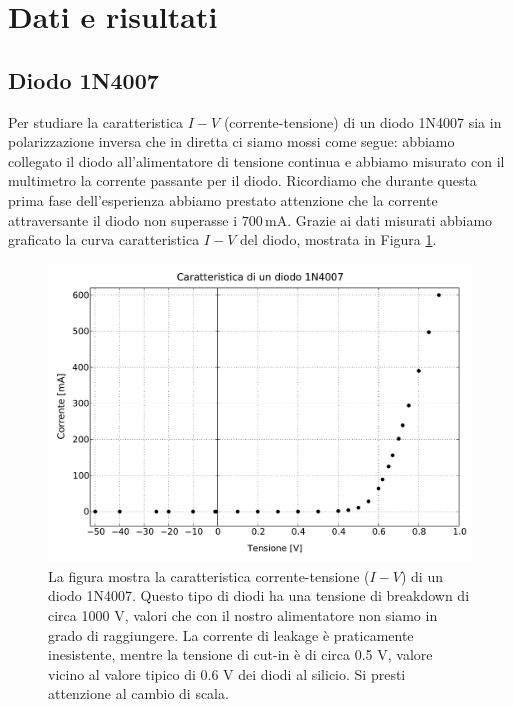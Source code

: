 \section*{Dati e risultati}

\subsection*{Diodo 1N4007}

Per studiare la caratteristica $I-V$ (corrente-tensione) di un diodo 1N4007 sia in polarizzazione inversa che in diretta ci siamo mossi come segue: abbiamo collegato il diodo all'alimentatore di tensione continua e abbiamo misurato con il multimetro la corrente passante per il diodo.
Ricordiamo che durante questa prima fase dell'esperienza abbiamo prestato attenzione che la corrente attraversante il diodo non superasse i $700\,\si{\milli\ampere}$.
Grazie ai dati misurati abbiamo graficato la curva caratteristica $I-V$ del diodo, mostrata in Figura \ref{fig:diodo}.

\begin{figure}
    \includegraphics[scale=0.55]{diodo.pdf}
    \caption{La figura mostra la caratteristica corrente-tensione ($I-V$) di un diodo 1N4007. Questo tipo di diodi ha una tensione di breakdown di circa 1000 V, valori che con il nostro alimentatore non siamo in grado di raggiungere.
    La corrente di leakage è praticamente inesistente, mentre la tensione di cut-in è di circa 0.5 V, valore vicino al valore tipico di 0.6 V dei diodi al silicio. 
    Si presti attenzione al cambio di scala.}
    \label{fig:diodo}
\end{figure}

